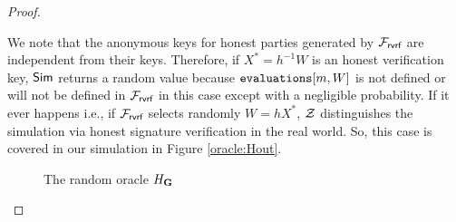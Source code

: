 \begin{proof}
\begin{itemize}
		We note that the anonymous keys for honest parties generated by $ \mathcal{F}_{\textsf{rvrf}} $ are independent from their keys. Therefore, if $ X^* = h^{-1}W $ is an honest verification key, $ \mathsf{Sim} $ returns a random value because  $ \texttt{evaluations}[m,W] $ is not defined or will not be defined in $ \mathcal{F}_{\textsf{rvrf}} $ in this case except with a negligible probability. If it ever happens i.e., if $ \mathcal{F}_{\textsf{rvrf}} $ selects randomly $ W = hX^* $, $ \mathcal{Z} $ distinguishes the simulation via honest signature verification in the real world. So, this case is covered in our simulation in Figure \ref{oracle:Hout}.

		
		\begin{figure}
			\begin{minipage}{4cm}
			\centering
			\noindent{}	
			\caption{The random oracle $ H_{\mathbf{G}} $}
			\label{oracle:HgnoPK}
		
	\end{minipage}
\hfill
	\begin{minipage}{7cm}
			\centering
			
			\noindent{}
\end{minipage}
\end{figure}
\end{itemize}
\end{proof}
